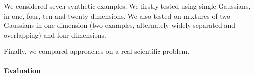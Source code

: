\documentclass{article} %
\begin{document}
We considered seven synthetic examples. We firstly tested using single Gaussians, in one, four, ten and twenty dimensions. We also tested on mixtures of two Gaussians in one dimension (two examples, alternately widely separated and overlapping) and four dimensions. %

Finally, we compared approaches on a real scientific problem. 




\paragraph{Evaluation}
\end{document}

